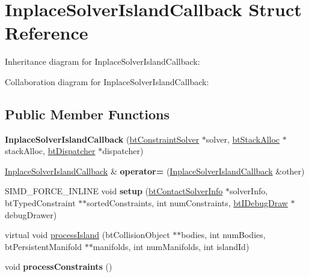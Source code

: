 \hypertarget{struct_inplace_solver_island_callback}{\section{Inplace\+Solver\+Island\+Callback Struct Reference}
\label{struct_inplace_solver_island_callback}
}


Inheritance diagram for Inplace\+Solver\+Island\+Callback\+:


Collaboration diagram for Inplace\+Solver\+Island\+Callback\+:
\subsection*{Public Member Functions}
\begin{DoxyCompactItemize}
\item 
\hypertarget{struct_inplace_solver_island_callback_a0a65e726e6f3252bb549768351a204b1}{{\bfseries Inplace\+Solver\+Island\+Callback} (\hyperlink{classbt_constraint_solver}{bt\+Constraint\+Solver} $\ast$solver, \hyperlink{classbt_stack_alloc}{bt\+Stack\+Alloc} $\ast$stack\+Alloc, \hyperlink{classbt_dispatcher}{bt\+Dispatcher} $\ast$dispatcher)}\label{struct_inplace_solver_island_callback_a0a65e726e6f3252bb549768351a204b1}

\item 
\hypertarget{struct_inplace_solver_island_callback_a335a17bc631e3f09c7e03d247a9e681d}{\hyperlink{struct_inplace_solver_island_callback}{Inplace\+Solver\+Island\+Callback} \& {\bfseries operator=} (\hyperlink{struct_inplace_solver_island_callback}{Inplace\+Solver\+Island\+Callback} \&other)}\label{struct_inplace_solver_island_callback_a335a17bc631e3f09c7e03d247a9e681d}

\item 
\hypertarget{struct_inplace_solver_island_callback_aee3a949a5d73b02d85565a9aa0355305}{S\+I\+M\+D\+\_\+\+F\+O\+R\+C\+E\+\_\+\+I\+N\+L\+I\+N\+E void {\bfseries setup} (\hyperlink{structbt_contact_solver_info}{bt\+Contact\+Solver\+Info} $\ast$solver\+Info, bt\+Typed\+Constraint $\ast$$\ast$sorted\+Constraints, int num\+Constraints, \hyperlink{classbt_i_debug_draw}{bt\+I\+Debug\+Draw} $\ast$debug\+Drawer)}\label{struct_inplace_solver_island_callback_aee3a949a5d73b02d85565a9aa0355305}

\item 
virtual void \hyperlink{struct_inplace_solver_island_callback_a9f9b7859f93b6c14c83cbe8ca11a02f8}{process\+Island} (bt\+Collision\+Object $\ast$$\ast$bodies, int num\+Bodies, bt\+Persistent\+Manifold $\ast$$\ast$manifolds, int num\+Manifolds, int island\+Id)
\item 
\hypertarget{struct_inplace_solver_island_callback_a2dcfc2c14ca46c733a6e189e28025f47}{void {\bfseries process\+Constraints} ()}\label{struct_inplace_solver_island_callback_a2dcfc2c14ca46c733a6e189e28025f47}

\end{DoxyCompactItemize}
